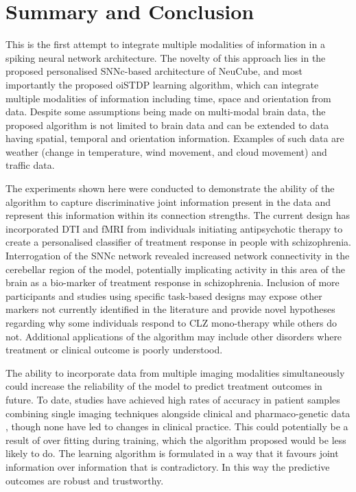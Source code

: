 \section{Summary and Conclusion}
\label{sec:conclusion}
This is the first attempt to integrate multiple modalities of information in a spiking neural network architecture. The novelty of this approach lies in the proposed personalised SNNc-based architecture of NeuCube, and most importantly the proposed oiSTDP learning algorithm, which can integrate multiple modalities of information including time, space and orientation from data. Despite some assumptions being made on multi-modal brain data, the proposed algorithm is not limited to brain data and can be extended to data having spatial, temporal and orientation information. Examples of such data are weather (change in temperature, wind movement, and cloud movement) and traffic data. 

The experiments shown here were conducted to demonstrate the ability of the algorithm to capture discriminative joint information present in the data and represent this information within its connection strengths. The current design has incorporated DTI and fMRI from individuals initiating antipsychotic therapy to create a personalised classifier of treatment response in people with schizophrenia. Interrogation of the SNNc network revealed increased network connectivity in the cerebellar region of the model, potentially implicating activity in this area of the brain as a bio-marker of treatment response in schizophrenia. Inclusion of more participants and studies using specific task-based designs may expose other markers not currently identified in the literature and provide novel hypotheses regarding why some individuals respond to CLZ mono-therapy while others do not. Additional applications of the algorithm may include other disorders where treatment or clinical outcome is poorly understood. 

The ability to incorporate data from multiple imaging modalities simultaneously could increase the reliability of the model to predict treatment outcomes in future. To date, studies have achieved high rates of accuracy in patient samples combining single imaging techniques alongside clinical and pharmaco-genetic data \citep{patel2015machine,khodayari2013machine}, though none have led to changes in clinical practice. This could potentially be a result of over fitting during training, which the algorithm proposed would be less likely to do. The learning algorithm is formulated in a way that it favours joint information over information that is contradictory. In this way the predictive outcomes are robust and trustworthy. 

